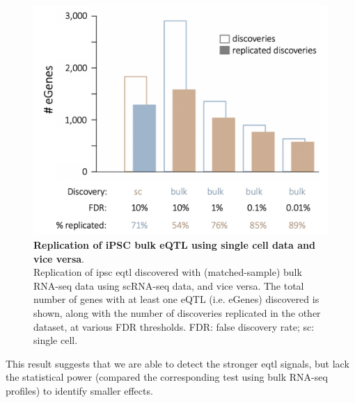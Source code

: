 \begin{figure}[h]
\centering
\includegraphics[width=12cm]{Chapter3/Fig/sc_vs_bulk_eqtl.png}
\caption[iPSC eQTL (bulk vs sc)]{\textbf{Replication of iPSC bulk eQTL using single cell data and vice versa}.\\
Replication of \gls{ipsc} \gls{eqtl} discovered with (matched-sample) bulk RNA-seq data using scRNA-seq data, and vice versa.
The total number of genes with at least one eQTL (i.e. eGenes) discovered is shown, along with the number of discoveries replicated in the other dataset, at various FDR thresholds. 
FDR: false discovery rate; sc: single cell.}
\label{fig:sc_bulk_egenes}
\end{figure}

This result suggests that we are able to detect the stronger \gls{eqtl} signals, but lack the statistical power (compared the corresponding test using bulk RNA-seq profiles) to identify smaller effects.


